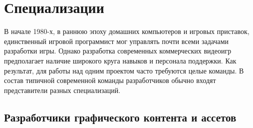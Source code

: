 \chapter{Специализации}

В начале 1980-х, в раннюю эпоху домашних компьютеров и игровых приставок, единственный игровой программист
мог управлять почти всеми задачами разработки игры. Однако разработка современных коммерческих видеоигр
предполагает наличие широкого круга навыков и персонала поддержки. Как результат, для работы над одним
проектом часто требуются целые команды. В состав типичной современной команды разработчиков обычно входят
представители разных специализаций.

\section{Разработчики графического контента и ассетов}
